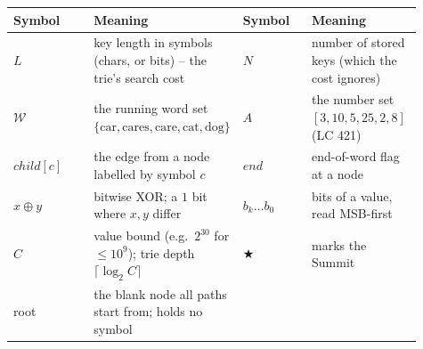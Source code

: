 \begin{center}
\renewcommand{\arraystretch}{1.2}
\setlength{\tabcolsep}{4pt}
\begin{tabular}{@{}p{0.20\linewidth} p{0.27\linewidth}@{\quad}p{0.17\linewidth} p{0.27\linewidth}@{}}
\toprule
\textbf{Symbol} & \textbf{Meaning} & \textbf{Symbol} & \textbf{Meaning} \\
\midrule
$L$                 & key length in symbols (chars, or bits) -- the trie's search cost & $N$ & number of stored keys (which the cost ignores) \\
$\mathcal{W}$        & the running word set $\{\text{car},\text{cares},\text{care},\text{cat},\text{dog}\}$ & $A$ & the number set $[3,10,5,25,2,8]$ (LC 421) \\
$\mathit{child}[c]$  & the edge from a node labelled by symbol $c$ & $\mathit{end}$ & end-of-word flag at a node \\
$x \oplus y$         & bitwise XOR; a $1$ bit where $x,y$ differ & $b_k\!\ldots b_0$ & bits of a value, read MSB-first \\
$C$                  & value bound (e.g.\ $2^{30}$ for $\le\!10^9$); trie depth $\lceil\log_2 C\rceil$ & $\bigstar$ & marks the Summit \\
root & the blank node all paths start from; holds no symbol & & \\
\bottomrule
\end{tabular}
\end{center}
